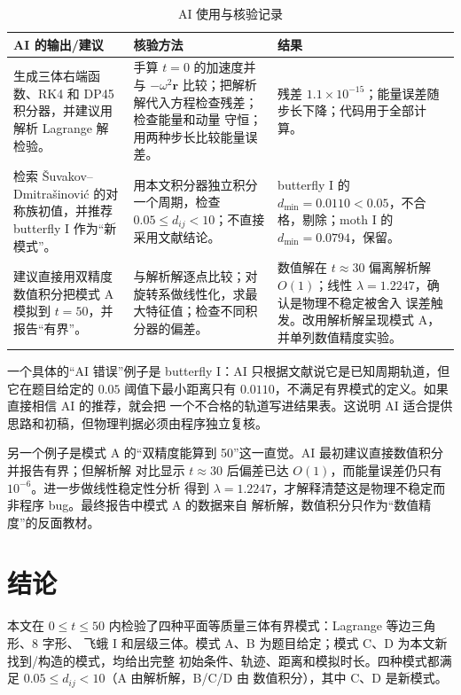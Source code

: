 \documentclass[UTF8,fontset=windows,11pt,a4paper]{ctexart}
\newcommand{\vect}[1]{\mathbf{#1}}
\begin{document}
\begin{table}[H]
\centering\footnotesize
\caption{AI 使用与核验记录}
\label{tab:ai}
\begin{tabular}{@{}p{4.7cm}p{5.5cm}p{4.6cm}@{}}
\toprule
AI 的输出/建议 & 核验方法 & 结果\\
\midrule
生成三体右端函数、RK4 和 DP45 积分器，并建议用解析 Lagrange 解检验。 &
手算 $t=0$ 的加速度并与 $-\omega^2\vect r$ 比较；把解析解代入方程检查残差；检查能量和动量
守恒；用两种步长比较能量误差。 &
残差 $1.1\times10^{-15}$；能量误差随步长下降；代码用于全部计算。\\
检索 Šuvakov--Dmitrašinović 的对称族初值，并推荐 butterfly I 作为“新模式”。 &
用本文积分器独立积分一个周期，检查 $0.05\le d_{ij}<10$；不直接采用文献结论。 &
butterfly I 的 $d_{\min}=0.0110<0.05$，不合格，剔除；moth I 的 $d_{\min}=0.0794$，保留。\\
建议直接用双精度数值积分把模式 A 模拟到 $t=50$，并报告“有界”。 &
与解析解逐点比较；对旋转系做线性化，求最大特征值；检查不同积分器的偏差。 &
数值解在 $t\approx30$ 偏离解析解 $O(1)$；线性 $\lambda=1.2247$，确认是物理不稳定被舍入
误差触发。改用解析解呈现模式 A，并单列数值精度实验。\\
\bottomrule
\end{tabular}
\end{table}

一个具体的“AI 错误”例子是 butterfly I：AI 只根据文献说它是已知周期轨道，但它在题目给定的
$0.05$ 阈值下最小距离只有 $0.0110$，不满足有界模式的定义。如果直接相信 AI 的推荐，就会把
一个不合格的轨道写进结果表。这说明 AI 适合提供思路和初稿，但物理判据必须由程序独立复核。

另一个例子是模式 A 的“双精度能算到 50”这一直觉。AI 最初建议直接数值积分并报告有界；但解析解
对比显示 $t\approx30$ 后偏差已达 $O(1)$，而能量误差仍只有 $10^{-6}$。进一步做线性稳定性分析
得到 $\lambda=1.2247$，才解释清楚这是物理不稳定而非程序 bug。最终报告中模式 A 的数据来自
解析解，数值积分只作为“数值精度”的反面教材。

\section{结论}\label{sec:conclusion}
本文在 $0\le t\le50$ 内检验了四种平面等质量三体有界模式：Lagrange 等边三角形、8 字形、
飞蛾 I 和层级三体。模式 A、B 为题目给定；模式 C、D 为本文新找到/构造的模式，均给出完整
初始条件、轨迹、距离和模拟时长。四种模式都满足 $0.05\le d_{ij}<10$（A 由解析解，B/C/D 由
数值积分），其中 C、D 是新模式。
\end{document}
